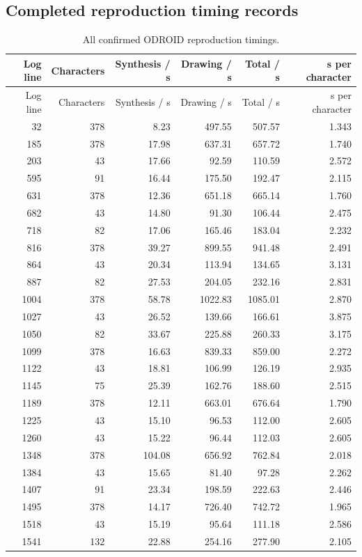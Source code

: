 \subsection{Completed reproduction timing records}\label{app:res-speed}
\begin{longtable}{rrrrrr}
\caption{All confirmed ODROID reproduction timings.}\label{tab:app-complete-timings}\\
\toprule Log line & Characters & Synthesis / s & Drawing / s & Total / s & s per character\\\midrule\endfirsthead
\toprule Log line & Characters & Synthesis / s & Drawing / s & Total / s & s per character\\\midrule\endhead
32 & 378 & 8.23 & 497.55 & 507.57 & 1.343\\
185 & 378 & 17.98 & 637.31 & 657.72 & 1.740\\
203 & 43 & 17.66 & 92.59 & 110.59 & 2.572\\
595 & 91 & 16.44 & 175.50 & 192.47 & 2.115\\
631 & 378 & 12.36 & 651.18 & 665.14 & 1.760\\
682 & 43 & 14.80 & 91.30 & 106.44 & 2.475\\
718 & 82 & 17.06 & 165.46 & 183.04 & 2.232\\
816 & 378 & 39.27 & 899.55 & 941.48 & 2.491\\
864 & 43 & 20.34 & 113.94 & 134.65 & 3.131\\
887 & 82 & 27.53 & 204.05 & 232.16 & 2.831\\
1004 & 378 & 58.78 & 1022.83 & 1085.01 & 2.870\\
1027 & 43 & 26.52 & 139.66 & 166.61 & 3.875\\
1050 & 82 & 33.67 & 225.88 & 260.33 & 3.175\\
1099 & 378 & 16.63 & 839.33 & 859.00 & 2.272\\
1122 & 43 & 18.81 & 106.99 & 126.19 & 2.935\\
1145 & 75 & 25.39 & 162.76 & 188.60 & 2.515\\
1189 & 378 & 12.11 & 663.01 & 676.64 & 1.790\\
1225 & 43 & 15.10 & 96.53 & 112.00 & 2.605\\
1260 & 43 & 15.22 & 96.44 & 112.03 & 2.605\\
1348 & 378 & 104.08 & 656.92 & 762.84 & 2.018\\
1384 & 43 & 15.65 & 81.40 & 97.28 & 2.262\\
1407 & 91 & 23.34 & 198.59 & 222.63 & 2.446\\
1495 & 378 & 14.17 & 726.40 & 742.72 & 1.965\\
1518 & 43 & 15.19 & 95.64 & 111.18 & 2.586\\
1541 & 132 & 22.88 & 254.16 & 277.90 & 2.105\\
\bottomrule\end{longtable}
